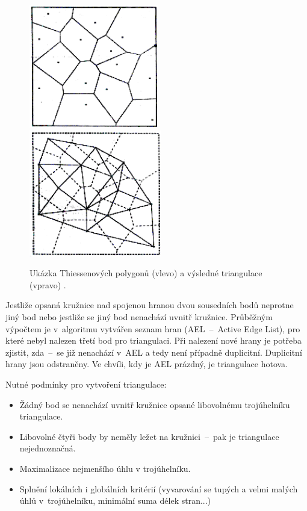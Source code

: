 \documentclass[a4paper, 12pt, oneside, titlepage]{article} %
\begin{document}
 \begin{figure}[!htb]
	\centering
	\includegraphics[scale=0.8]{obrazky/th_pol.png} 
	\includegraphics[scale=0.8]{obrazky/dt_obr.png}
	\caption{Ukázka Thiessenových polygonů (vlevo) a výsledné triangulace (vpravo) \cite{zcu}.
	}
	\label{fig:th_pol}
\end{figure} 
\FloatBarrier
 
Jestliže opsaná kružnice nad spojenou hranou dvou sousedních bodů neprotne jiný bod nebo jestliže se jiný bod nenachází uvnitř kružnice. Průběžným výpočtem je v~algoritmu vytvářen seznam hran (AEL~--~Active Edge List), pro které nebyl nalezen třetí bod pro triangulaci. Při nalezení nové hrany je potřeba zjistit, zda~--~se již nenachází v~AEL a tedy není případně duplicitní. Duplicitní hrany jsou odstraněny. Ve chvíli, kdy je AEL prázdný, je triangulace hotova. 

Nutné podmínky pro vytvoření triangulace:
\begin{itemize}
\item Žádný bod se nenachází uvnitř kružnice opsané libovolnému trojúhelníku triangulace.
\item Libovolné čtyři body by neměly ležet na kružnici~--~pak je triangulace nejednoznačná.
\item Maximalizace nejmenšího úhlu v trojúhelníku.
\item Splnění lokálních i globálních kritérií (vyvarování se tupých a velmi malých úhlů v~trojúhelníku, minimální suma délek stran...)
\end{itemize}
\end{document}
